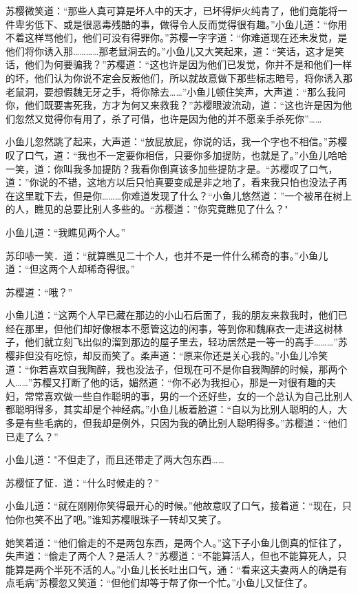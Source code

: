\documentclass[12pt,oneside]{book}
\begin{document}
苏樱微笑道：``那些人真可算是坏人中的天才，已坏得炉火纯青了，他们竟能将一件卑劣低下、或是很恶毒残酷的事，做得令人反而觉得很有趣。''小鱼儿道：``你用不着这样骂他们，他们可没有得罪你。''苏樱一字字道：``你难道现在还未发觉，是他们将你诱入那\ldots\ldots\ldots\ldots 那老鼠洞去的。''小鱼儿又大笑起来，道：``笑话，这才是笑话，他们为何要骗我？''苏樱道：``这也许是因为他们已发觉，你并不是和他们一样的坏，他们认为你说不定会反叛他们，所以就故意做下那些标志暗号，将你诱入那老鼠洞，要想假魏无牙之手，将你除去\ldots\ldots{}''小鱼儿顿住笑声，大声道：``那么我问你，他们既要害死我，方才为何又来救我？''苏樱眼波流动，道：``这也许是因为他们忽然又觉得你有用了，杀了可借，也许是因为他的并不愿亲手杀死你''\ldots\ldots{}

小鱼儿忽然跳了起来，大声道：``放屁放屁，你说的话，我一个字也不相信。''苏樱叹了口气，道：``我也不一定要你相信，只要你多加提防，也就是了。''小鱼儿哈哈一笑，道：你叫我多加提防？我看你倒真该多加些提防才是。``苏樱叹了口气，道：''你说的不错，这地方以后只怕真要变成是非之地了，看来我只怕也没法子再在这里耽下去，但是你\ldots\ldots\ldots 你难道发现了什么？``小鱼儿悠然道：''一个被吊在树上的人，瞧见的总要比别人多些的。``苏樱道：''你究竟瞧见了什么？"

小鱼儿道：``我瞧见两个人。''

苏印哧一笑．道：``就算瞧见二十个人，也并不是一件什么稀奇的事。''小鱼儿道：``但这两个人却稀奇得很。''

苏樱道：``哦？''

小鱼儿道：``这两个人早已藏在那边的小山石后面了，我的朋友来救我时，他们已经在那里，但他们却好像根本不愿管这边的闲事，等到你和魏麻衣一走进这树林子，他们就立刻飞出似的溜到那边的屋子里去，轻功居然是一等一的高手\ldots\ldots\ldots{}''苏樱非但没有吃惊，却反而笑了。柔声道：``原来你还是关心我的。''小鱼儿冷笑道：``你若喜欢自我陶醉，我也没法子，但现在可不是你自我陶醉的时候，那两个人\ldots\ldots{}''苏樱又打断了他的话，媚然道：``你不必为我担心，那是一对很有趣的夫妇，常常喜欢做一些自作聪明的事，男的一个还好些，女的一个总认为自己比别人都聪明得多，其实却是个神经病。''小鱼儿板着脸道：``自以为比别人聪明的人，大多是有些毛病的，但我却是例外，只因为我的确比别人聪明得多。''苏樱道：``他们已走了么？''

小鱼儿道："不但走了，而且还带走了两大包东西\ldots\ldots{}

苏樱怔了怔．道：``什么时候走的？''

小鱼儿道：``就在刚刚你笑得最开心的时候。''他故意叹了口气，接着道：``现在，只怕你也笑不出了吧。''谁知苏樱眼珠子一转却又笑了。

她笑着道：``他们偷走的不是两包东西，是两个人。''这下子小鱼儿倒真的怔往了，失声道：``偷走了两个人？是活人？''苏樱道：``不能算活人，但也不能算死人，只能算是两个半死不活的人。''小鱼儿长长吐出口气，通：``看来这夫妻两人的确是有点毛病''苏樱忽又笑道：``但他们却等于帮了你一个忙。''小鱼儿又怔住了。
\end{document}
